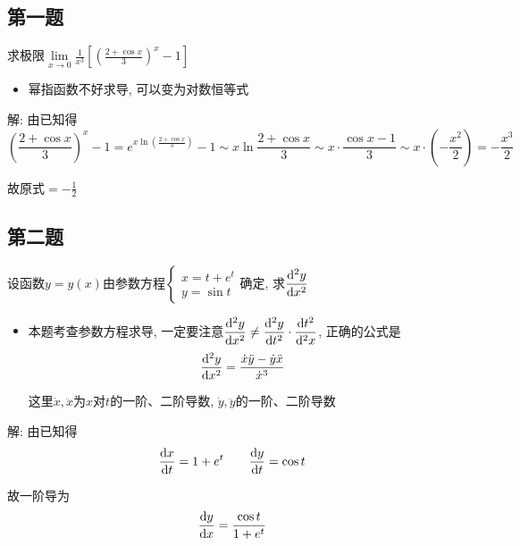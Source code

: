 \documentclass[10pt]{SelfArx} %
\numberwithin{dummy}{section}
\newenvironment{corollary}{\begin{cBox}\noindent{\bf\color{color1} 分析}}{\end{cBox}}
\begin{document}
\subsection{第一题}
求极限$\lim\limits_{x\to 0}\displaystyle\frac{1}{x^3}[(\displaystyle\frac{2+\cos x}{3})^x -1]$
\begin{corollary}
	\begin{itemize}
		\item 幂指函数不好求导, 可以变为对数恒等式
	\end{itemize}
\end{corollary}
解: 由已知得
\begin{displaymath}
	(\displaystyle\frac{2+\cos x}{3})^x -1=e^{x\ln(\displaystyle\frac{2+\cos x}{3})}-1\sim x\ln\displaystyle\frac{2+\cos x}{3}\sim x\cdot\displaystyle\frac{\cos x-1}{3}\sim x\cdot (-\displaystyle\frac{x^2}{2})=-\displaystyle\frac{x^3}{2}
\end{displaymath}

故原式$=-\displaystyle\frac{1}{2}$
\subsection{第二题}
设函数$y=y(x)$由参数方程$\begin{cases}
x=t+e^t\\
y=\sin t
\end{cases}$确定, 求$\displaystyle\frac{{\rm d}^2 y}{{\rm d} x^2}$
\begin{corollary}
	\begin{itemize}
		\item 本题考查参数方程求导, 一定要注意$\displaystyle\frac{{\rm d}^2y}{{\rm d}x^2}\neq \displaystyle\frac{{\rm d}^2y}{{\rm d}t^2}\cdot\displaystyle\frac{{\rm d}t^2}{{\rm d}^2x}$, 正确的公式是
		\begin{displaymath}
			\displaystyle\frac{{\rm d}^2y}{{\rm d}x^2}=\displaystyle\frac{\dot{x}\ddot{y}-\dot{y}\ddot{x}}{\dot{x}^3}
		\end{displaymath}
		
		这里$\dot{x},\ddot{x}$为$x$对$t$的一阶、二阶导数, $\dot{y},\ddot{y}$的一阶、二阶导数
	\end{itemize}
\end{corollary}
解: 由已知得
\begin{displaymath}
	\displaystyle\frac{{\rm d}x}{{\rm d}t}=1+e^t\qquad\displaystyle\frac{{\rm d}y}{{\rm d}t}=\cos t
\end{displaymath}

故一阶导为
\begin{displaymath}
	\displaystyle\frac{{\rm d}y}{{\rm d}x}=\displaystyle\frac{\cos t}{1+e^t}
\end{displaymath}
\end{document}
